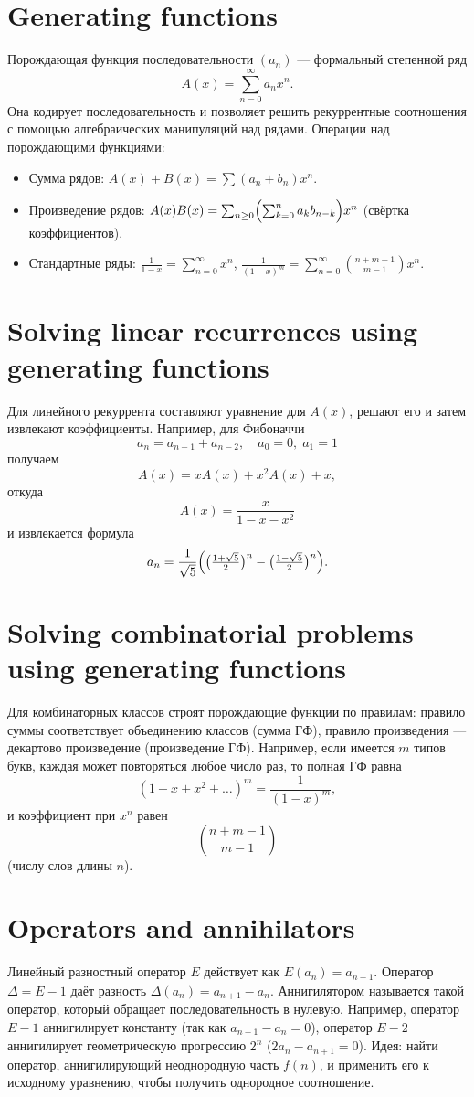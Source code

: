 \documentclass{article}
\begin{document}
	\section{Generating functions}
	Порождающая функция последовательности $(a_n)$ --- формальный степенной ряд
	\[
	A(x) = \sum_{n=0}^\infty a_n x^n.
	\]
	Она кодирует последовательность и позволяет решить рекуррентные соотношения с помощью алгебраических манипуляций над рядами. Операции над порождающими функциями:
	\begin{itemize}
		\item Сумма рядов: $A(x)+B(x)=\sum (a_n+b_n)x^n$.
		\item Произведение рядов: $A(x)B(x)=\sum_{n\ge0}\Bigl(\sum_{k=0}^n a_k b_{n-k}\Bigr)x^n$ (свёртка коэффициентов).
		\item Стандартные ряды: $\frac{1}{1-x}=\sum_{n=0}^\infty x^n$, \;$\frac{1}{(1-x)^m}=\sum_{n=0}^\infty \binom{n+m-1}{m-1}x^n$.
	\end{itemize}
	
	\section{Solving linear recurrences using generating functions}
	Для линейного рекуррента составляют уравнение для $A(x)$, решают его и затем извлекают коэффициенты. Например, для Фибоначчи 
	\[
	a_n = a_{n-1} + a_{n-2},\quad a_0=0,\;a_1=1
	\]
	получаем 
	\[
	A(x) = xA(x) + x^2 A(x) + x,
	\]
	откуда 
	\[
	A(x)=\frac{x}{1-x-x^2}
	\]
	и извлекается формула 
	\[
	a_n = \frac{1}{\sqrt5}\Bigl(\bigl(\tfrac{1+\sqrt5}2\bigr)^n - \bigl(\tfrac{1-\sqrt5}2\bigr)^n\Bigr).
	\]
	
	\section{Solving combinatorial problems using generating functions}
	Для комбинаторных классов строят порождающие функции по правилам: правило суммы соответствует объединению классов (сумма ГФ), правило произведения --- декартово произведение (произведение ГФ). Например, если имеется $m$ типов букв, каждая может повторяться любое число раз, то полная ГФ равна 
	\[
	(1+x+x^2+\dots)^m = \frac{1}{(1-x)^m},
	\]
	и коэффициент при $x^n$ равен 
	\[
	\binom{n+m-1}{m-1}
	\]
	(числу слов длины $n$).
	
	\section{Operators and annihilators}
	Линейный разностный оператор $E$ действует как $E(a_n)=a_{n+1}$. Оператор $\Delta = E-1$ даёт разность $\Delta(a_n)=a_{n+1}-a_n$. Аннигилятором называется такой оператор, который обращает последовательность в нулевую. Например, оператор $E-1$ аннигилирует константу (так как $a_{n+1}-a_n=0$), оператор $E-2$ аннигилирует геометрическую прогрессию $2^n$ ($2a_{n} - a_{n+1}=0$). Идея: найти оператор, аннигилирующий неоднородную часть $f(n)$, и применить его к исходному уравнению, чтобы получить однородное соотношение.
	
\end{document}
